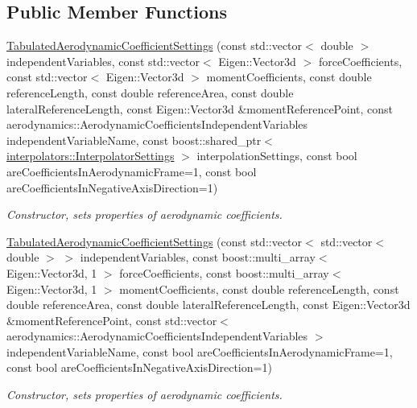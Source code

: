 \subsection*{Public Member Functions}
\begin{DoxyCompactItemize}
\item 
\hyperlink{classtudat_1_1simulation__setup_1_1TabulatedAerodynamicCoefficientSettings_3_011_01_4_aaa7de23b189f8461b9bcec784cadc070}{Tabulated\+Aerodynamic\+Coefficient\+Settings} (const std\+::vector$<$ double $>$ independent\+Variables, const std\+::vector$<$ Eigen\+::\+Vector3d $>$ force\+Coefficients, const std\+::vector$<$ Eigen\+::\+Vector3d $>$ moment\+Coefficients, const double reference\+Length, const double reference\+Area, const double lateral\+Reference\+Length, const Eigen\+::\+Vector3d \&moment\+Reference\+Point, const aerodynamics\+::\+Aerodynamic\+Coefficients\+Independent\+Variables independent\+Variable\+Name, const boost\+::shared\+\_\+ptr$<$ \hyperlink{classtudat_1_1interpolators_1_1InterpolatorSettings}{interpolators\+::\+Interpolator\+Settings} $>$ interpolation\+Settings, const bool are\+Coefficients\+In\+Aerodynamic\+Frame=1, const bool are\+Coefficients\+In\+Negative\+Axis\+Direction=1)
\begin{DoxyCompactList}\small\item\em Constructor, sets properties of aerodynamic coefficients. \end{DoxyCompactList}\item 
\hyperlink{classtudat_1_1simulation__setup_1_1TabulatedAerodynamicCoefficientSettings_3_011_01_4_ad783723c3c3f76cdc8a37eccb67022c3}{Tabulated\+Aerodynamic\+Coefficient\+Settings} (const std\+::vector$<$ std\+::vector$<$ double $>$ $>$ independent\+Variables, const boost\+::multi\+\_\+array$<$ Eigen\+::\+Vector3d, 1 $>$ force\+Coefficients, const boost\+::multi\+\_\+array$<$ Eigen\+::\+Vector3d, 1 $>$ moment\+Coefficients, const double reference\+Length, const double reference\+Area, const double lateral\+Reference\+Length, const Eigen\+::\+Vector3d \&moment\+Reference\+Point, const std\+::vector$<$ aerodynamics\+::\+Aerodynamic\+Coefficients\+Independent\+Variables $>$ independent\+Variable\+Name, const bool are\+Coefficients\+In\+Aerodynamic\+Frame=1, const bool are\+Coefficients\+In\+Negative\+Axis\+Direction=1)
\begin{DoxyCompactList}\small\item\em Constructor, sets properties of aerodynamic coefficients. \end{DoxyCompactList}\item 

\end{DoxyCompactItemize}
